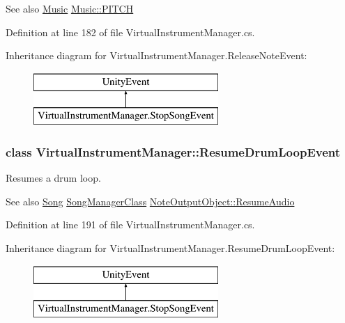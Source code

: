 \begin{DoxySeeAlso}{See also}
\hyperlink{class_music}{Music} \hyperlink{group___music_enums_ga508f69b199ea518f935486c990edac1d}{Music\+::\+P\+I\+T\+CH} 
\end{DoxySeeAlso}


Definition at line 182 of file Virtual\+Instrument\+Manager.\+cs.

Inheritance diagram for Virtual\+Instrument\+Manager.\+Release\+Note\+Event\+:\begin{figure}[H]
\begin{center}
\leavevmode
\includegraphics[height=2.000000cm]{group___v_i_m_event_types}
\end{center}
\end{figure}
\label{class_virtual_instrument_manager_1_1_resume_drum_loop_event}
\subsubsection{class Virtual\+Instrument\+Manager\+:\+:Resume\+Drum\+Loop\+Event}
Resumes a drum loop. 

\begin{DoxySeeAlso}{See also}
\hyperlink{class_song}{Song} \hyperlink{class_song_manager_class}{Song\+Manager\+Class} \hyperlink{group___n_o_o_pub_func_ga2df8edec357dd4123146c9a7e8485ffb}{Note\+Output\+Object\+::\+Resume\+Audio} 
\end{DoxySeeAlso}


Definition at line 191 of file Virtual\+Instrument\+Manager.\+cs.

Inheritance diagram for Virtual\+Instrument\+Manager.\+Resume\+Drum\+Loop\+Event\+:\begin{figure}[H]
\begin{center}
\leavevmode
\includegraphics[height=2.000000cm]{group___v_i_m_event_types}
\end{center}
\end{figure}
\label{class_virtual_instrument_manager_1_1_resume_song_event}
